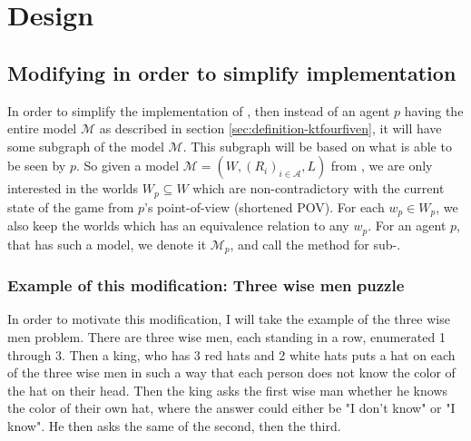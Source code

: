 \section{Design}

\newcommand{\POVModel}{\mathcal{M}}


\subsection{Modifying \KTfourfiveN in order to simplify implementation}
In order to simplify the implementation of \KTfourfiveN, then instead of an agent $p$ having the entire model $\mathcal{M}$ as described in section \ref{sec:definition-ktfourfiven}, it will have some subgraph of the model $\mathcal{M}$. This subgraph will be based on what is able to be seen by $p$. So given a model $\mathcal{M} = (W,(R_i)_{i\in \mathcal{A}},L)$ from \KTfourfiveN, we are only interested in the worlds $W_{p} \subseteq W$ which are non-contradictory with the current state of the game from $p$'s point-of-view (shortened POV). For each $w_p \in W_{p}$, we also keep the worlds which has an equivalence relation to any $w_p$.
For an agent $p$, that has such a model, we denote it $\mathcal{M}_p$, and call the method for sub-\KTfourfiveN.

\subsubsection{Example of this modification: Three wise men puzzle}\label{sec:motivation}
In order to motivate this modification, I will take the example of the three wise men problem.
There are three wise men, each standing in a row, enumerated 1 through 3. 
Then a king, who has 3 red hats and 2 white hats puts a hat on each of the three wise men in such a way that each person does not know the color of the hat on their head. 
Then the king asks the first wise man whether he knows the color of their own hat, where the answer could either be "I don't know" or "I know". 
He then asks the same of the second, then the third.

